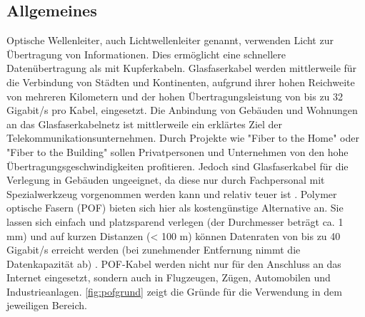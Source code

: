 \subsection{Allgemeines}
\label{subsec:pofallgemeines}

Optische Wellenleiter, auch Lichtwellenleiter genannt, verwenden Licht zur
Übertragung von Informationen. Dies ermöglicht eine schnellere Datenübertragung
als mit Kupferkabeln. Glasfaserkabel werden mittlerweile für die Verbindung von
Städten und Kontinenten, aufgrund ihrer hohen Reichweite von mehreren Kilometern
und der hohen Übertragungsleistung von bis zu 32 Gigabit/s pro Kabel,
eingesetzt. Die Anbindung von Gebäuden und Wohnungen an das Glasfaserkabelnetz
ist mittlerweile ein erklärtes Ziel der Telekommunikationsunternehmen. Durch
Projekte wie "Fiber to the Home" oder
"Fiber to the Building" sollen Privatpersonen und
Unternehmen von den hohe Übertragungsgeschwindigkeiten profitieren. Jedoch sind
Glasfaserkabel für die Verlegung in Gebäuden ungeeignet, da diese nur durch
Fachpersonal mit Spezialwerkzeug vorgenommen werden kann und relativ teuer ist
\cite{poflan}. Polymer optische Fasern (POF) bieten sich hier als kostengünstige
Alternative an. Sie lassen sich einfach und platzsparend verlegen (der
Durchmesser beträgt ca. 1 mm) und auf kurzen Distanzen (< 100 m) können
Datenraten von bis zu 40 Gigabit/s \cite{pofacgif} erreicht werden (bei
zunehmender Entfernung nimmt die Datenkapazität ab) \cite{pofacprofile}.
POF-Kabel werden nicht nur für den Anschluss an das Internet eingesetzt, sondern
auch in Flugzeugen, Zügen, Automobilen und Industrieanlagen.
\autoref{fig:pofgrund} zeigt die Gründe für die Verwendung in dem jeweiligen
Bereich.

